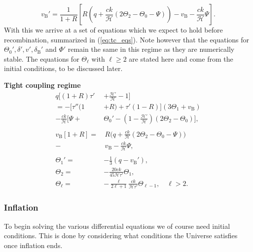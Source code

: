 \documentclass[%
reprint,
 amsmath,amssymb,
 aps,
]{revtex4-2}
\newcommand{\Hp}{\mathcal{H}}
\begin{document}
\[v_\text{B}'=\frac{1}{1+R}\left[R\left(q+\frac{ck}{\Hp}\left(2\Theta_2-\Theta_0-\Psi\right)\right)-v_\text{B}-\frac{ck}{\Hp}\Psi\right].\]
With this we arrive at a set of equations which we expect to hold before recombination, summarized in (\ref{eq:tc_eqs}). Note however that the equations for $\Theta_0',\delta',v',\delta_\text{B}'$ and $\Phi'$ remain the same in this regime as they are numerically stable. The equations for $\Theta_\ell$ with $\ell\geq2$ are stated here and come from the initial conditions, to be discussed later.
\begin{tcolorbox}[
	width=\linewidth,
	colback=black!3!white,
	]
	\textbf{Tight coupling regime}
	\begin{subequations}\label{eq:tc_eqs}
		\begin{align}
			q\biggl[(1+R)\tau'&+\frac{\Hp'}{\Hp}-1\biggr]\nonumber\\
			=-\bigl[\tau''(1&+R)+\tau'(1-R)\bigr](3\Theta_1+v_\text{B})\nonumber\\
			-\frac{ck}{\Hp}\biggl[\Psi+&\Theta_0'-\left(1-\frac{\Hp'}{\Hp}\right)(2\Theta_2-\Theta_0)\biggr],\\
			\nonumber\\
			v_\text{B}[1+R]=&\,R\biggl(q+\frac{ck}{\Hp}\left(2\Theta_2-\Theta_0-\Psi\right)\biggr)\nonumber\\
			-&\,v_\text{B}-\frac{ck}{\Hp}\Psi,\\
			\nonumber\\
			\Theta_1'=&-\frac{1}{3}(q-v_\text{B}'),\\
			\Theta_2=&-\frac{20ck}{45\Hp\tau'}\Theta_1,\\
			\Theta_\ell=&-\frac{\ell}{2\ell+1}\frac{ck}{\Hp\tau'}\Theta_{\ell-1},\quad \ell>2.
		\end{align}
	\end{subequations}
\end{tcolorbox}



\subsubsection{Inflation}
To begin solving the various differential equations we of course need initial conditions. This is done by considering what conditions the Universe satisfies once inflation ends. 
\end{document}
